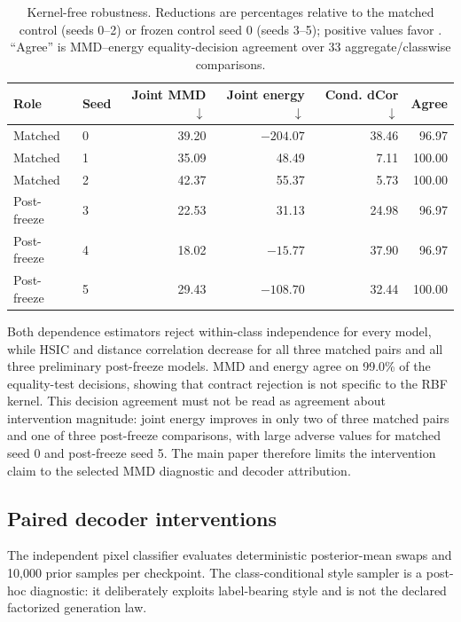 \begin{table}[ht]
\caption{Kernel-free robustness.  Reductions are percentages relative to the
matched control (seeds 0--2) or frozen control seed 0 (seeds 3--5); positive
values favor \FACT{}.  ``Agree'' is MMD--energy equality-decision agreement
over 33 aggregate/classwise comparisons.}
\label{tab:fact-kernel-robustness}
\centering
\scriptsize
\setlength{\tabcolsep}{5pt}
\begin{tabular}{llrrrr}
\toprule
Role & Seed & Joint MMD $\downarrow$ & Joint energy $\downarrow$ & Cond. dCor $\downarrow$ & Agree \\
\midrule
Matched & 0 & 39.20 & $-204.07$ & 38.46 & 96.97 \\
Matched & 1 & 35.09 & 48.49 & 7.11 & 100.00 \\
Matched & 2 & 42.37 & 55.37 & 5.73 & 100.00 \\
\midrule
Post-freeze & 3 & 22.53 & 31.13 & 24.98 & 96.97 \\
Post-freeze & 4 & 18.02 & $-15.77$ & 37.90 & 96.97 \\
Post-freeze & 5 & 29.43 & $-108.70$ & 32.44 & 100.00 \\
\bottomrule
\end{tabular}
\end{table}

Both dependence estimators reject within-class independence for every model,
while HSIC and distance correlation decrease for all three matched pairs and
all three preliminary post-freeze models.  MMD and energy agree on 99.0\% of
the equality-test decisions, showing that contract rejection is not specific
to the RBF kernel.  This decision agreement must not be read as agreement about
intervention magnitude: joint energy improves in only two of three matched
pairs and one of three post-freeze comparisons, with large adverse values for
matched seed 0 and post-freeze seed 5.  The main paper therefore limits the
intervention claim to the selected MMD diagnostic and decoder attribution.

\subsection{Paired decoder interventions}

The independent pixel classifier evaluates deterministic posterior-mean swaps
and 10,000 prior samples per checkpoint.  The class-conditional style sampler
is a post-hoc diagnostic: it deliberately exploits label-bearing style and is
not the declared factorized generation law.

